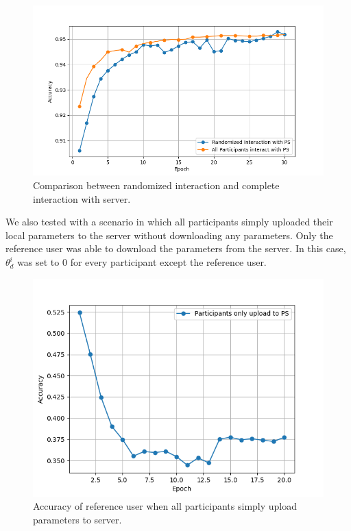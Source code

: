 \documentclass[conference]{IEEEtran}
\begin{document}
\begin{figure}[!h]
\centering
\includegraphics[width=\columnwidth, keepaspectratio]{RandomVsAllGrid}
\caption{Comparison between randomized interaction and complete interaction with server. }
\label{fig:RandVsAll}
\end{figure}

We also tested with a scenario in which all participants simply uploaded their local parameters to the server without downloading any parameters. Only the reference user was able to download the parameters from the server. In this case, $\theta_d^i$ was set to 0 for every participant except the reference user.
\begin{figure}[!h]
\centering
\includegraphics[width=\columnwidth, keepaspectratio]{AllUploadNoDownloadGrid}
\caption{Accuracy of reference user when all participants simply upload parameters to server. }
\label{fig:AllUploadNoDownloadGrid}
\end{figure}
\end{document}
